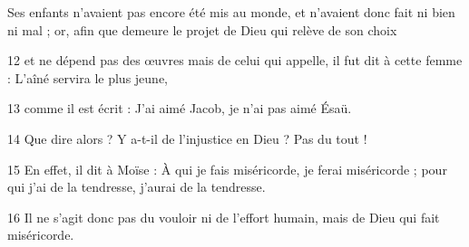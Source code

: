  Ses enfants n’avaient pas encore été mis au monde, et n’avaient donc fait ni bien ni mal ; or, afin que demeure le projet de Dieu qui relève de son choix

12 et ne dépend pas des œuvres mais de celui qui appelle, il fut dit à cette femme : L’aîné servira le plus jeune,

13 comme il est écrit : J’ai aimé Jacob, je n’ai pas aimé Ésaü.

14 Que dire alors ? Y a-t-il de l’injustice en Dieu ? Pas du tout !

15 En effet, il dit à Moïse : À qui je fais miséricorde, je ferai miséricorde ; pour qui j’ai de la tendresse, j’aurai de la tendresse.

16 Il ne s’agit donc pas du vouloir ni de l’effort humain, mais de Dieu qui fait miséricorde.